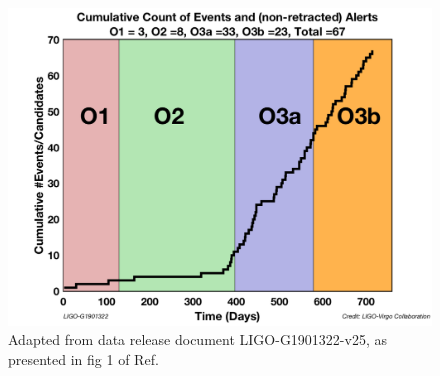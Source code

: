\documentclass[11pt]{article}
\begin{document}
\begin{figure}[t!]
    \centering
    \includegraphics[width=.6\linewidth]{shared_resources/shared_figs/number_events.png}
    \caption{Adapted from data release document LIGO-G1901322-v25, as presented in fig 1 of Ref.~\cite{gwtc2}}
    \label{fig:events}
\end{figure}





\printbibliography
\end{document}
